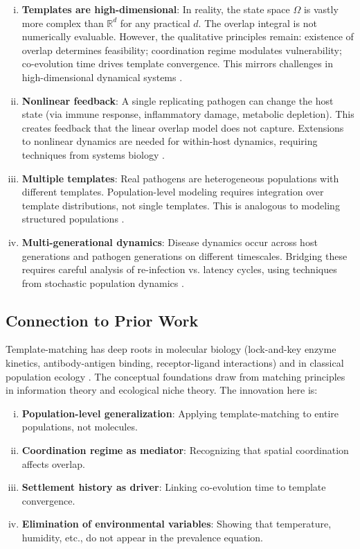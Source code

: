 \documentclass[11pt,twocolumn,a4paper]{article}
\newcommand{\R}{\mathbb{R}}
\begin{document}
\begin{enumerate}[(i)]
\item \textbf{Templates are high-dimensional}: In reality, the state space $\Omega$ is vastly more complex than $\R^d$ for any practical $d$. The overlap integral is not numerically evaluable. However, the qualitative principles remain: existence of overlap determines feasibility; coordination regime modulates vulnerability; co-evolution time drives template convergence. This mirrors challenges in high-dimensional dynamical systems \cite{kauffman1969metabolic}.

\item \textbf{Nonlinear feedback}: A single replicating pathogen can change the host state (via immune response, inflammatory damage, metabolic depletion). This creates feedback that the linear overlap model does not capture. Extensions to nonlinear dynamics are needed for within-host dynamics, requiring techniques from systems biology \cite{alon2003introduction}.

\item \textbf{Multiple templates}: Real pathogens are heterogeneous populations with different templates. Population-level modeling requires integration over template distributions, not single templates. This is analogous to modeling structured populations \cite{metz1992dynamics}.

\item \textbf{Multi-generational dynamics}: Disease dynamics occur across host generations and pathogen generations on different timescales. Bridging these requires careful analysis of re-infection vs. latency cycles, using techniques from stochastic population dynamics \cite{kurtz1970solutions}.
\end{enumerate}

\subsection{Connection to Prior Work}

Template-matching has deep roots in molecular biology (lock-and-key enzyme kinetics, antibody-antigen binding, receptor-ligand interactions) and in classical population ecology \cite{holling1959components}. The conceptual foundations draw from matching principles in information theory \cite{macarthur1955factor} and ecological niche theory. The innovation here is:
\begin{enumerate}[(i)]
\item \textbf{Population-level generalization}: Applying template-matching to entire populations, not molecules.
\item \textbf{Coordination regime as mediator}: Recognizing that spatial coordination affects overlap.
\item \textbf{Settlement history as driver}: Linking co-evolution time to template convergence.
\item \textbf{Elimination of environmental variables}: Showing that temperature, humidity, etc., do not appear in the prevalence equation.
\end{enumerate}
\end{document}
